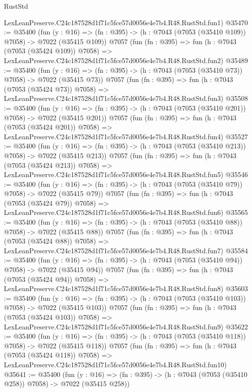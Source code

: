 \begin{lexlean}{RustStd}
\begin{coremodule}
    LexLeanPreserve.C24c187528d1f71c5fce57d0056e4e7b4.R48.RustStd.fun1)
@35470 := @35400
    (fun (y : @16) => (fn : @395) -> (h : @7043 (@7053 (@35410 @109)) @7058) -> @7022 (@35415 @109))
    @7057
    (fun (fn : @395) =>
    fun (h : @7043 (@7053 (@35424 @109)) @7058) =>
    LexLeanPreserve.C24c187528d1f71c5fce57d0056e4e7b4.R48.RustStd.fun2)
@35489 := @35400
    (fun (y : @16) => (fn : @395) -> (h : @7043 (@7053 (@35410 @73)) @7058) -> @7022 (@35415 @73))
    @7057
    (fun (fn : @395) =>
    fun (h : @7043 (@7053 (@35424 @73)) @7058) =>
    LexLeanPreserve.C24c187528d1f71c5fce57d0056e4e7b4.R48.RustStd.fun3)
@35508 := @35400
    (fun (y : @16) => (fn : @395) -> (h : @7043 (@7053 (@35410 @201)) @7058) -> @7022 (@35415 @201))
    @7057
    (fun (fn : @395) =>
    fun (h : @7043 (@7053 (@35424 @201)) @7058) =>
    LexLeanPreserve.C24c187528d1f71c5fce57d0056e4e7b4.R48.RustStd.fun4)
@35527 := @35400
    (fun (y : @16) => (fn : @395) -> (h : @7043 (@7053 (@35410 @213)) @7058) -> @7022 (@35415 @213))
    @7057
    (fun (fn : @395) =>
    fun (h : @7043 (@7053 (@35424 @213)) @7058) =>
    LexLeanPreserve.C24c187528d1f71c5fce57d0056e4e7b4.R48.RustStd.fun5)
@35546 := @35400
    (fun (y : @16) => (fn : @395) -> (h : @7043 (@7053 (@35410 @79)) @7058) -> @7022 (@35415 @79))
    @7057
    (fun (fn : @395) =>
    fun (h : @7043 (@7053 (@35424 @79)) @7058) =>
    LexLeanPreserve.C24c187528d1f71c5fce57d0056e4e7b4.R48.RustStd.fun6)
@35565 := @35400
    (fun (y : @16) => (fn : @395) -> (h : @7043 (@7053 (@35410 @88)) @7058) -> @7022 (@35415 @88))
    @7057
    (fun (fn : @395) =>
    fun (h : @7043 (@7053 (@35424 @88)) @7058) =>
    LexLeanPreserve.C24c187528d1f71c5fce57d0056e4e7b4.R48.RustStd.fun7)
@35584 := @35400
    (fun (y : @16) => (fn : @395) -> (h : @7043 (@7053 (@35410 @94)) @7058) -> @7022 (@35415 @94))
    @7057
    (fun (fn : @395) =>
    fun (h : @7043 (@7053 (@35424 @94)) @7058) =>
    LexLeanPreserve.C24c187528d1f71c5fce57d0056e4e7b4.R48.RustStd.fun8)
@35603 := @35400
    (fun (y : @16) => (fn : @395) -> (h : @7043 (@7053 (@35410 @103)) @7058) -> @7022 (@35415 @103))
    @7057
    (fun (fn : @395) =>
    fun (h : @7043 (@7053 (@35424 @103)) @7058) =>
    LexLeanPreserve.C24c187528d1f71c5fce57d0056e4e7b4.R48.RustStd.fun9)
@35622 := @35400
    (fun (y : @16) => (fn : @395) -> (h : @7043 (@7053 (@35410 @118)) @7058) -> @7022 (@35415 @118))
    @7057
    (fun (fn : @395) =>
    fun (h : @7043 (@7053 (@35424 @118)) @7058) =>
    LexLeanPreserve.C24c187528d1f71c5fce57d0056e4e7b4.R48.RustStd.fun10)
@35641 := @35400
    (fun (y : @16) => (fn : @395) -> (h : @7043 (@7053 (@35410 @258)) @7058) -> @7022 (@35415 @258))

\end{coremodule}
\end{lexlean}
